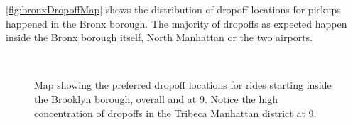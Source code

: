 \documentclass{acm_proc_article-sp-sigmod09}
\begin{document}
\cref{fig:bronxDropoffMap} shows the distribution of dropoff locations for pickups happened in the Bronx borough. The majority of dropoffs as expected happen inside the Bronx borough itself, North Manhattan or the two airports.

\begin{figure}
	\centering
	\\
	\caption{Map showing the preferred dropoff locations for rides starting inside the Brooklyn borough, overall and at 9. Notice the high concentration of dropoffs in the Tribeca Manhattan district at 9.}
\end{figure}
\end{document}
